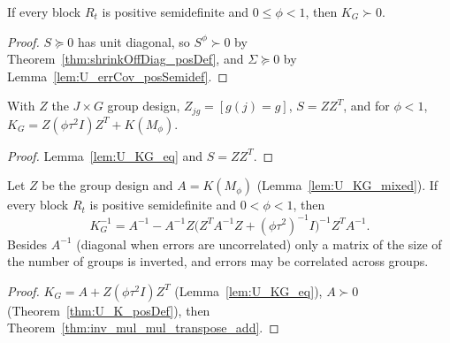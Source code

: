\begin{theorem}\label{thm:U_KG_posDef}
  \leanok
  If every block $R_t$ is positive semidefinite and $0 \le \phi < 1$, then
  $K_G \succ 0$.
\end{theorem}
\begin{proof}
  \leanok
  $S \succeq 0$ has unit diagonal, so $S^\phi \succ 0$ by
  Theorem~\ref{thm:shrinkOffDiag_posDef}, and $\Sigma \succeq 0$ by
  Lemma~\ref{lem:U_errCov_posSemidef}.
\end{proof}

\begin{lemma}\label{lem:U_KG_mixed}
  \leanok
  With $Z$ the $J \times G$ group design, $Z_{jg} = [g(j) = g]$, $S = ZZ^T$, and for $\phi < 1$,
  $K_G = Z(\phi\tau^2 I)Z^T + K(M_\phi)$.
\end{lemma}
\begin{proof}
  \leanok
  Lemma~\ref{lem:U_KG_eq} and $S = ZZ^T$.
\end{proof}

\begin{theorem}\label{thm:U_KG_inv_eq}
  \leanok
  Let $Z$ be the group design and $A = K(M_\phi)$ (Lemma~\ref{lem:U_KG_mixed}). If every block $R_t$ is positive semidefinite and $0 < \phi < 1$, then
  \[
    K_G^{-1} = A^{-1} - A^{-1}Z\bigl(Z^TA^{-1}Z + (\phi\tau^2)^{-1}I\bigr)^{-1}Z^TA^{-1}.
  \]
  Besides $A^{-1}$ (diagonal when errors are uncorrelated) only a matrix of the size of the
  number of groups is inverted, and errors may be correlated across groups.
\end{theorem}
\begin{proof}
  \leanok
  $K_G = A + Z(\phi\tau^2 I)Z^T$ (Lemma~\ref{lem:U_KG_eq}), $A \succ 0$
  (Theorem~\ref{thm:U_K_posDef}), then Theorem~\ref{thm:inv_mul_mul_transpose_add}.
\end{proof}

